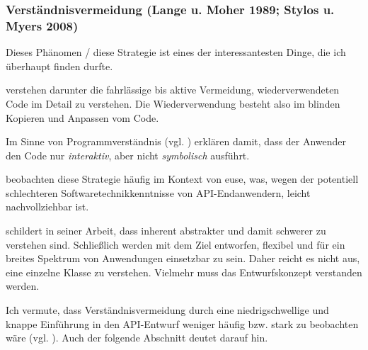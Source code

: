 \subsubsection{Verständnisvermeidung (Lange u. Moher 1989; Stylos u. Myers 2008)}
\label{sec:Verstandnisvermeidung}

\begin{important}
Dieses Phänomen / diese Strategie ist eines der interessantesten Dinge, die ich überhaupt finden durfte.

\cite{Lange:1989jr,Stylos:2008jt} verstehen darunter die fahrlässige bis aktive Vermeidung, wiederverwendeten Code im Detail zu verstehen. Die Wiederverwendung besteht also im blinden Kopieren und Anpassen vom Code.

Im Sinne von Programmverständnis (vgl. ) erklären \cite{Lange:1989jr} damit, dass der Anwender den Code nur \textit{interaktiv}, aber nicht \textit{symbolisch} ausführt.

\cite{Ko:2005cl} beobachten diese Strategie häufig im Kontext von \gls{euse}, was, wegen der potentiell schlechteren Softwaretechnikkenntnisse von API-Endanwendern, leicht nachvollziehbar ist.

\cite{Bruch:2006bv} schildert in seiner Arbeit, dass  inherent abstrakter und damit schwerer zu verstehen sind. Schließlich werden  mit dem Ziel entworfen, flexibel und für ein breites Spektrum von Anwendungen einsetzbar zu sein. Daher reicht es nicht aus, eine einzelne Klasse zu verstehen. Vielmehr muss das Entwurfskonzept verstanden werden.

Ich vermute, dass Verständnisvermeidung durch eine niedrigschwellige und knappe Einführung in den API-Entwurf weniger häufig bzw. stark zu beobachten wäre (vgl. ). Auch der folgende Abschnitt deutet darauf hin.
\end{important}







